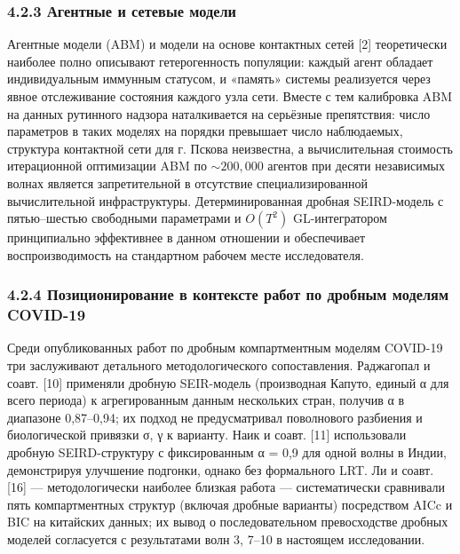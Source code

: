 \documentclass[12pt]{article}
\begin{document}
\subsubsection{4.2.3 Агентные и сетевые
модели}\label{ux430ux433ux435ux43dux442ux43dux44bux435-ux438-ux441ux435ux442ux435ux432ux44bux435-ux43cux43eux434ux435ux43bux438-1}

Агентные модели (ABM) и модели на основе контактных сетей {[}2{]}
теоретически наиболее полно описывают гетерогенность популяции: каждый
агент обладает индивидуальным иммунным статусом, и «память» системы
реализуется через явное отслеживание состояния каждого узла сети. Вместе
с тем калибровка ABM на данных рутинного надзора наталкивается на
серьёзные препятствия: число параметров в таких моделях на порядки
превышает число наблюдаемых, структура контактной сети для г. Пскова
неизвестна, а вычислительная стоимость итерационной оптимизации ABM по
\(\sim 200,000\) агентов при десяти независимых волнах является
запретительной в отсутствие специализированной вычислительной
инфраструктуры. Детерминированная дробная SEIRD-модель с пятью--шестью
свободными параметрами и \(O(T^2)\) GL-интегратором принципиально
эффективнее в данном отношении и обеспечивает воспроизводимость на
стандартном рабочем месте исследователя.

\subsubsection{4.2.4 Позиционирование в контексте работ по дробным
моделям
COVID-19}\label{ux43fux43eux437ux438ux446ux438ux43eux43dux438ux440ux43eux432ux430ux43dux438ux435-ux432-ux43aux43eux43dux442ux435ux43aux441ux442ux435-ux440ux430ux431ux43eux442-ux43fux43e-ux434ux440ux43eux431ux43dux44bux43c-ux43cux43eux434ux435ux43bux44fux43c-covid-19-1}

Среди опубликованных работ по дробным компартментным моделям COVID-19
три заслуживают детального методологического сопоставления. Раджагопал и
соавт. {[}10{]} применяли дробную SEIR-модель (производная Капуто,
единый α для всего периода) к агрегированным данным нескольких стран,
получив α в диапазоне 0,87--0,94; их подход не предусматривал
поволнового разбиения и биологической привязки σ, γ к варианту. Наик и
соавт. {[}11{]} использовали дробную SEIRD-структуру с фиксированным α =
0,9 для одной волны в Индии, демонстрируя улучшение подгонки, однако без
формального LRT. Ли и соавт. {[}16{]} --- методологически наиболее
близкая работа --- систематически сравнивали пять компартментных
структур (включая дробные варианты) посредством AICc и BIC на китайских
данных; их вывод о последовательном превосходстве дробных моделей
согласуется с результатами волн 3, 7--10 в настоящем исследовании.
\end{document}
